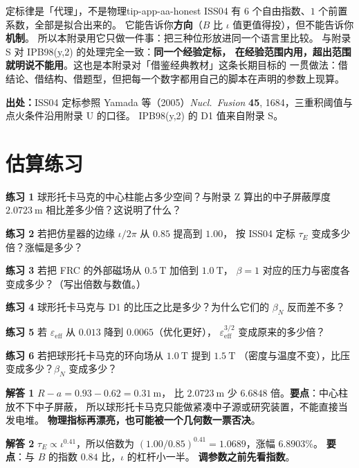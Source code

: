 \begin{tip}{定标律是「代理」，不是物理}{tip-app-aa-honest}
ISS04 有 $6$ 个自由指数、$1$ 个前置系数，全部是拟合出来的。
它能告诉你\textbf{方向}（$B$ 比 $\iota$ 值更值得投），但不能告诉你\textbf{机制}。
所以本附录用它只做一件事：把三种位形放进同一个语言里比较。
与附录 S 对 IPB98(y,2) 的处理完全一致：\textbf{同一个经验定标，
在经验范围内用，超出范围就明说不能用}。这也是本附录对「借鉴经典教材」这条长期目标的
一贯做法：借结论、借结构、借题型，但把每一个数字都用自己的脚本在声明的参数上现算。
\end{tip}

{\footnotesize
\textbf{出处：}ISS04 定标参照 Yamada 等（2005）\emph{Nucl.\ Fusion} \textbf{45}, 1684，三重积阈值与点火条件沿用附录 U 的口径。
IPB98(y,2) 的 D1 值来自附录 S。
}

\section{估算练习}
\label{sec:app-aa-problems}

\textbf{练习 1} 球形托卡马克的中心柱能占多少空间？与附录 Z 算出的中子屏蔽厚度
$2.0723\ \mathrm{m}$ 相比差多少倍？这说明了什么？

\textbf{练习 2} 若把仿星器的边缘 $\iota/2\pi$ 从 $0.85$ 提高到 $1.00$，
按 ISS04 定标 $\tau_E$ 变成多少倍？涨幅是多少？

\textbf{练习 3} 若把 FRC 的外部磁场从 $0.5\ \mathrm{T}$ 加倍到 $1.0\ \mathrm{T}$，
$\beta=1$ 对应的压力与密度各变成多少？（写出倍数与数值。）

\textbf{练习 4} 球形托卡马克与 D1 的比压之比是多少？为什么它们的 $\beta_N$ 反而差不多？

\textbf{练习 5} 若 $\varepsilon_{\mathrm{eff}}$ 从 $0.013$ 降到 $0.0065$（优化更好），
$\varepsilon_{\mathrm{eff}}^{3/2}$ 变成原来的多少倍？

\textbf{练习 6} 若把球形托卡马克的环向场从 $1.0\ \mathrm{T}$ 提到 $1.5\ \mathrm{T}$
（密度与温度不变），比压变成多少？$\beta_N$ 变成多少？

\textbf{解答 1} $R-a = 0.93-0.62 = 0.31\ \mathrm{m}$，
比 $2.0723\ \mathrm{m}$ 少 $6.6848$ 倍。\textbf{要点}：中心柱放不下中子屏蔽，
所以球形托卡马克只能做紧凑中子源或研究装置，不能直接当发电堆。
\textbf{物理指标再漂亮，也可能被一个几何数一票否决}。

\textbf{解答 2} $\tau_E \propto \iota^{0.41}$，所以倍数为
$(1.00/0.85)^{0.41} = 1.0689$，涨幅 $6.8903\%$。
\textbf{要点}：与 $B$ 的指数 $0.84$ 比，$\iota$ 的杠杆小一半。
\textbf{调参数之前先看指数}。

